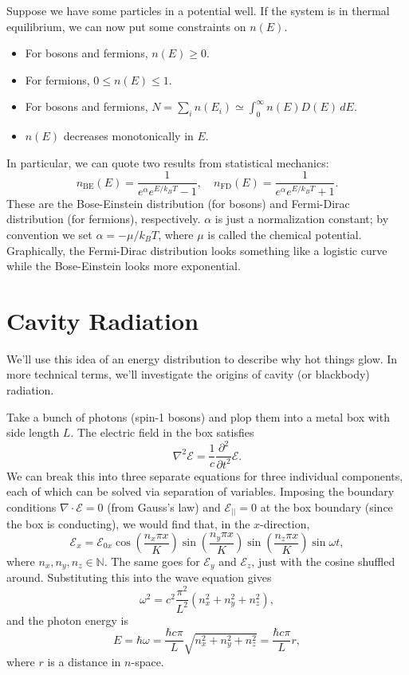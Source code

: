 \documentclass[../p052main.tex]{subfiles}
\begin{document}
Suppose we have some particles in a potential well.
If the system is in thermal equilibrium, we can now put some constraints on $n(E)$.
\begin{itemize}
    \item For bosons and fermions, $n(E) \geq 0$.
    \item For fermions, $0 \leq n(E) \leq 1$.
    \item For bosons and fermions, $N = \sum_{i}^{} n(E_i) \simeq \int_{0}^{\infty} n(E) D(E) \,dE$.
    \item $n(E)$ decreases monotonically in $E$.
\end{itemize}
In particular, we can quote two results from statistical mechanics:
\[ n_\textrm{BE}(E) = \frac{1}{e^{\alpha}e^{E / k_BT} - 1}, \quad n_\textrm{FD}(E) = \frac{1}{e^{\alpha}e^{E / k_BT} + 1}. \]
These are the Bose-Einstein distribution (for bosons) and Fermi-Dirac distribution (for fermions), respectively.
$\alpha$ is just a normalization constant; by convention we set $\alpha = -\mu / k_BT$, where $\mu$ is called the chemical potential.
Graphically, the Fermi-Dirac distribution looks something like a logistic curve while the Bose-Einstein looks more exponential.

\section{Cavity Radiation}
We'll use this idea of an energy distribution to describe why hot things glow.
In more technical terms, we'll investigate the origins of cavity (or blackbody) radiation.

Take a bunch of photons (spin-1 bosons) and plop them into a metal box with side length $L$.
The electric field in the box satisfies
\[ \nabla^2 \boldsymbol{\mathcal{E}} = \frac{1}{c} \frac{\partial^2}{\partial t^2} \boldsymbol{\mathcal{E}}. \]
We can break this into three separate equations for three individual components, each of which can be solved via separation of variables.
Imposing the boundary conditions $\nabla \cdot \boldsymbol{\mathcal{E}} = 0$ (from Gauss's law) and $\mathcal{E}_{||} = 0$ at the box boundary (since the box is conducting), we would find that, in the $x$-direction,
\[ \mathcal{E}_x = \mathcal{E}_{0x} \cos\left( \frac{n_x \pi x}{K} \right) \sin\left( \frac{n_y \pi x}{K} \right) \sin\left( \frac{n_z \pi x}{K} \right) \sin \omega t, \]
where $n_x,n_y,n_z \in \mathbb{N}$.
The same goes for $\mathcal{E}_y$ and $\mathcal{E}_z$, just with the cosine shuffled around.
Substituting this into the wave equation gives
\[ \omega^2 = c^2 \frac{\pi^2}{L^2} \left( n_x^2 + n_y^2 + n_z^2 \right), \]
and the photon energy is
\[ E = \hbar \omega = \frac{\hbar c \pi}{L} \sqrt{n_x^2 + n_y^2 + n_z^2} = \frac{\hbar c \pi}{L} r, \]
where $r$ is a distance in $n$-space.
\end{document}
